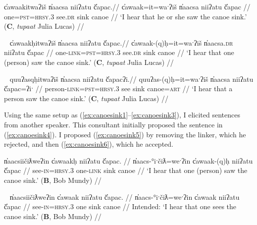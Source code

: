 \ex \label{ex:canoesink1}
\begingl
\glpreamble c̓awaakitwaʔiš n̓aacsa niiʔatu č̓apac.//
\gla c̓awaak=it=waˑʔiš n̓aacsa niiʔatu č̓apac //
\glb one=\textsc{pst}=\textsc{hrsy.3} see.\textsc{dr} sink canoe //
\glft `I hear that he or she saw the canoe sink.' (\textbf{C}, \textit{tupaat} Julia Lucas) //
\endgl
\xe

\ex~ \label{ex:canoesink2}
\begingl
\glpreamble c̓awaakḥitwaʔiš n̓aacsa niiʔatu č̓apac.//
\gla c̓awaak-(q)ḥ=it=waˑʔiš n̓aacsa.\textsc{dr} niiʔatu č̓apac //
\glb one-\textsc{link}=\textsc{pst}=\textsc{hrsy.3} see.\textsc{dr} sink canoe //
\glft `I hear that one (person) saw the canoe sink.' (\textbf{C}, \textit{tupaat} Julia Lucas) //
\endgl
\xe

\ex~ \label{ex:canoesink3}
\begingl
\glpreamble quuʔasqḥitwaʔiš n̓aacsa niiʔatu č̓apacʔi.//
\gla quuʔas-(q)ḥ=it=waˑʔiš n̓aacsa niiʔatu č̓apac=ʔiˑ //
\glb person-\textsc{link}=\textsc{pst}=\textsc{hrsy.3} see sink canoe=\textsc{art} //
\glft `I hear that a person saw the canoe sink.' (\textbf{C}, \textit{tupaat} Julia Lucas) //
\endgl
\xe


Using the same setup as (\ref{ex:canoesink1}--\ref{ex:canoesink3}), I elicited sentences from another speaker. This consultant initially proposed the sentence in (\ref{ex:canoesink4}). I proposed (\ref{ex:canoesink5}) by removing the linker, which he rejected, and then (\ref{ex:canoesink6}), which he accepted.

\ex \label{ex:canoesink4}
\begingl
\glpreamble n̓aacsiičiƛweʔin c̓awaakḥ niiʔatu č̓apac. //
\gla n̓aacs-°iˑčiƛ=weˑʔin c̓awaak-(q)ḥ niiʔatu č̓apac //
\glb see-\textsc{in}=\textsc{hrsy.3} one-\textsc{link} sink canoe //
\glft `I hear that one (person) saw the canoe sink.' (\textbf{B}, Bob Mundy) //
\endgl
\xe

\ex~ \label{ex:canoesink5}
\begingl
\glpreamble *n̓aacsiičiƛweʔin c̓awaak niiʔatu č̓apac. //
\gla n̓aacs-°iˑčiƛ=weˑʔin c̓awaak niiʔatu č̓apac //
\glb see-\textsc{in}=\textsc{hrsy.3} one sink canoe //
\glft Intended: `I hear that one sees the canoe sink.' (\textbf{B}, Bob Mundy) //
\endgl
\xe

